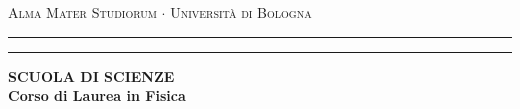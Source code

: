 \begin{center}
{
	{\Large
		{\textsc{Alma Mater Studiorum $\cdot$ Università di Bologna}}
	}
}
\rule[0.1cm]{18cm}{0.1mm}
\rule[0.5cm]{18cm}{0.6mm}
{\small
	{\bf SCUOLA DI SCIENZE\\
		Corso di Laurea in Fisica
	}
}
{\let\newpage\relax\maketitle}
\end{center}

